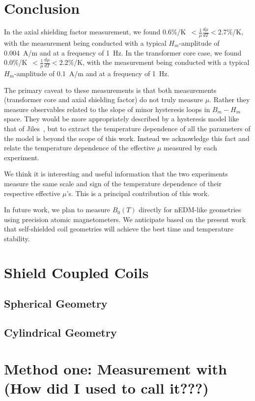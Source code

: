 \section{Conclusion}

In the axial shielding factor measurement, we found
0.6\%/K~$<\frac{1}{\mu}\frac{d\mu}{dT}<2.7\%$/K, with the measurement
being conducted with a typical $H_m$-amplitude of 0.004~A/m and at a
frequency of 1~Hz.  In the transformer core case, we found
0.0\%/K~$<\frac{1}{\mu}\frac{d\mu}{dT}<2.2\%$/K, with the measurement
being conducted with a typical $H_m$-amplitude of 0.1~A/m and at a
frequency of 1~Hz.

The primary caveat to these measurements is that both measurements
(transformer core and axial shielding factor) do not truly measure
$\mu$.  Rather they measure observables related to the slope of minor
hysteresis loops in $B_m-H_m$ space.  They would be more appropriately
described by a hysteresis model like that of Jiles~\cite{jiles},
but to extract the temperature dependence of all the parameters of the
model is beyond the scope of this work.  Instead we acknowledge this
fact and relate the temperature dependence of the effective $\mu$
measured by each experiment.

We think it is interesting and useful information that the two
experiments measure the same scale and sign of the temperature
dependence of their respective effective $\mu$'s.  This is a principal
contribution of this work.

In future work, we plan to measure $B_0(T)$ directly for nEDM-like
geometries using precision atomic magnetometers.  We anticipate based
on the present work that self-shielded coil geometries will achieve
the best time and temperature stability.







\section{Shield Coupled Coils}
\subsection{Spherical Geometry}
\subsection{Cylindrical Geometry}


\section{Method one: Measurement with (How did I used to call it???) }

